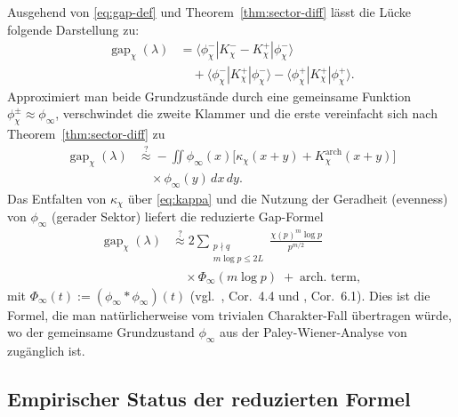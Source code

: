 \documentclass[10pt,twocolumn]{article}
\theoremstyle{definition}
\theoremstyle{remark}
\newcommand{\gap}{\operatorname{gap}}
\newcommand{\chifn}{\chi}
\begin{document}
Ausgehend von \eqref{eq:gap-def} und
Theorem~\ref{thm:sector-diff} lässt die Lücke folgende Darstellung zu:
\begin{equation}
\label{eq:gap-matrix}
\begin{aligned}
  \gap_{\chifn}(\lambda)
    &= \langle\phi_{\chifn}^-|K_{\chifn}^--K_{\chifn}^+|\phi_{\chifn}^-\rangle\\
    &\quad + \langle\phi_{\chifn}^-|K_{\chifn}^+|\phi_{\chifn}^-\rangle
      - \langle\phi_{\chifn}^+|K_{\chifn}^+|\phi_{\chifn}^+\rangle.
\end{aligned}
\end{equation}
Approximiert man beide Grundzustände durch eine gemeinsame Funktion
$\phi_{\chifn}^\pm\approx\phi_\infty$, verschwindet die zweite Klammer und
die erste vereinfacht sich nach Theorem~\ref{thm:sector-diff} zu
\begin{equation}
\label{eq:gap-reduced}
\begin{aligned}
  \gap_{\chifn}(\lambda)
    &\overset{?}{\approx}
      -\iint \phi_\infty(x)\bigl[\kappa_{\chifn}(x+y)
      +K^{\mathrm{arch}}_{\chifn}(x+y)\bigr]\\
    &\quad\times\phi_\infty(y)\,dx\,dy.
\end{aligned}
\end{equation}
Das Entfalten von $\kappa_{\chifn}$ über \eqref{eq:kappa} und die Nutzung der Geradheit
(evenness) von $\phi_\infty$ (gerader Sektor) liefert die reduzierte Gap-Formel
\begin{equation}
\label{eq:gap-reduced-explicit}
\begin{aligned}
  \gap_{\chifn}(\lambda)
    &\overset{?}{\approx}
      2\sum_{\substack{p\nmid q\\m\log p\leq 2L}}
        \frac{\chifn(p)^m\log p}{p^{m/2}}\\
    &\quad\times\Phi_\infty(m\log p)
      \;+\;\text{arch.\ term},
\end{aligned}
\end{equation}
mit $\Phi_\infty(t):=(\phi_\infty\ast\phi_\infty)(t)$
(vgl.\ \cite{AnalyticKernel}, Cor.~4.4 und \cite{AnalyticGroundstate},
Cor.~6.1). Dies ist die Formel, die man natürlicherweise vom
trivialen Charakter-Fall übertragen würde, wo der gemeinsame Grundzustand $\phi_\infty$
aus der Paley-Wiener-Analyse von \cite{RH_II} zugänglich ist.

\subsection{Empirischer Status der reduzierten Formel}
\label{sec:formula-reduced-empirical}
\end{document}
